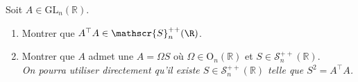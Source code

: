 Soit $A \in \mathrm{GL}_n(\mathbb{R})$.
\begin{enumerate}
\item Montrer que $A^\top A\in\mathscr{S}_n^{++}(\R)$.
\item Montrer que $A$ admet une  $A=\Omega S$
où $\Omega \in \mathrm{O}_n(\mathbb{R})$ et $S \in \mathscr{S}_n^{++}(\mathbb{R})$.\\
\emph{On pourra utiliser directement qu'il existe $S\in\mathscr{S}_n^{++}(\mathbb R)$ telle que $S^2=A^{\top}A$.}
\end{enumerate}





